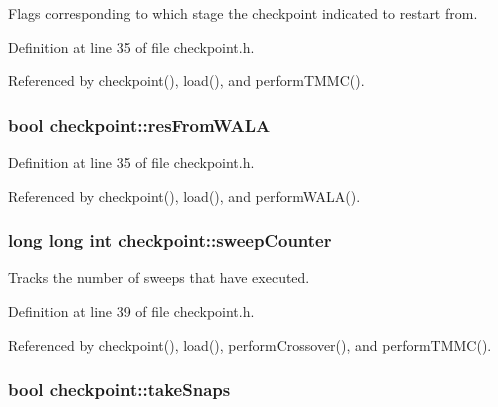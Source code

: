 Flags corresponding to which stage the checkpoint indicated to restart from. 



Definition at line 35 of file checkpoint.\-h.



Referenced by checkpoint(), load(), and perform\-T\-M\-M\-C().

\hypertarget{classcheckpoint_a46f1c17d03901292f642ccad0a325d9e}{
\subsubsection[{res\-From\-W\-A\-L\-A}]{\setlength{\rightskip}{0pt plus 5cm}bool checkpoint\-::res\-From\-W\-A\-L\-A}}\label{classcheckpoint_a46f1c17d03901292f642ccad0a325d9e}


Definition at line 35 of file checkpoint.\-h.



Referenced by checkpoint(), load(), and perform\-W\-A\-L\-A().

\hypertarget{classcheckpoint_ad011ddbca1ea708321335b1b3ac67e07}{
\subsubsection[{sweep\-Counter}]{\setlength{\rightskip}{0pt plus 5cm}long long int checkpoint\-::sweep\-Counter}}\label{classcheckpoint_ad011ddbca1ea708321335b1b3ac67e07}


Tracks the number of sweeps that have executed. 



Definition at line 39 of file checkpoint.\-h.



Referenced by checkpoint(), load(), perform\-Crossover(), and perform\-T\-M\-M\-C().

\hypertarget{classcheckpoint_a685226e8bae8084937f73f65c326c362}{
\subsubsection[{take\-Snaps}]{\setlength{\rightskip}{0pt plus 5cm}bool checkpoint\-::take\-Snaps}}\label{classcheckpoint_a685226e8bae8084937f73f65c326c362}


